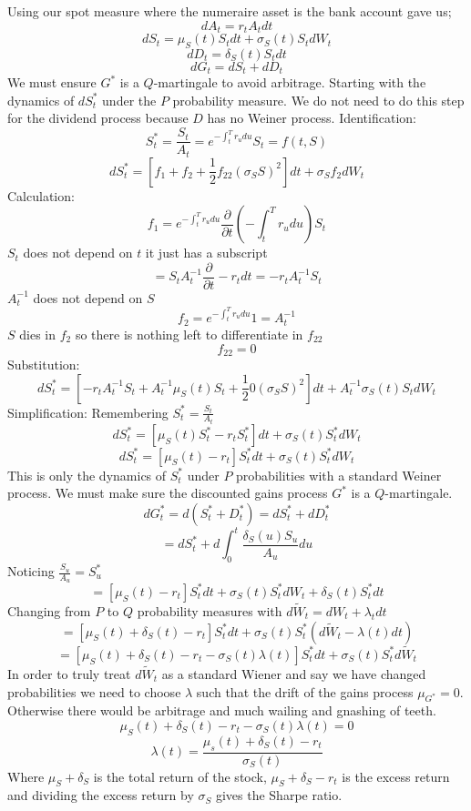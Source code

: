 \documentclass[12pt]{article}
\begin{document}
Using our spot measure where the numeraire asset is the bank account gave us;
$$dA_t=r_tA_tdt$$
$$dS_t=\mu_S(t)S_tdt+\sigma_S(t)S_tdW_t$$
$$dD_t=\delta_S(t)S_tdt$$
$$dG_t=dS_t+dD_t$$
We must ensure $G^*$ is a $Q$-martingale to avoid arbitrage. Starting with the
dynamics of $dS_t^*$ under the $P$ probability measure. We do not need to do
this step for the dividend process because $D$ has no Weiner process.
Identification:
$$S_t^*=\frac{S_t}{A_t}=e^{-\int_t^Tr_udu}S_t=f(t,S)$$
$$dS_t^*=\left[ f_1+f_2+\frac{1}{2}f_{22}(\sigma_SS)^2 \right] dt+
\sigma_Sf_2dW_t$$
Calculation:
$$f_1=e^{-\int_t^Tr_udu}\frac{\partial}{\partial t}
\left( -\int_t^Tr_udu\right) S_t$$
$S_t$ does not depend on $t$ it just has a subscript
$$=S_tA_t^{-1}\frac{\partial}{\partial t}-r_tdt=-r_tA_t^{-1}S_t$$
$A_t^{-1}$ does not depend on $S$
$$f_2=e^{-\int_t^Tr_udu}1=A_t^{-1}$$
$S$ dies in $f_2$ so there is nothing left to differentiate in $f_{22}$
$$f_{22}=0$$
Substitution:
$$dS_t^*=\left[ -r_tA_t^{-1}S_t+A_t^{-1}\mu_S(t)S_t+\frac{1}{2}0(\sigma_SS)^2
\right] dt+A_t^{-1}\sigma_S(t)S_tdW_t$$
Simplification: Remembering $S_t^*=\frac{S_t}{A_t}$
$$dS_t^*=\left[ \mu_S(t)S_t^*-r_tS_t^*\right] dt+\sigma_S(t)S_t^*dW_t$$
$$dS_t^*=\left[ \mu_S(t)-r_t\right] S_t^*dt+\sigma_S(t)S_t^*dW_t$$
This is only the dynamics of $S_t^*$ under $P$ probabilities with a standard
Weiner process.
We must make sure the discounted gains process $G^*$ is a $Q$-martingale.
$$dG_t^*=d(S_t^*+D_t^*)=dS_t^*+dD_t^*$$
$$=dS_t^*+d\int_0^t\frac{\delta_S(u)S_u}{A_u}du$$
Noticing $\frac{S_u}{A_u}=S_u^*$
$$=[\mu_S(t)-r_t]S_t^*dt+\sigma_S(t)S_t^*dW_t+\delta_S(t)S_t^*dt$$
Changing from $P$ to $Q$ probability measures with
$d\tilde{W}_t=dW_t+\lambda_tdt$
$$=[\mu_S(t)+\delta_S(t)-r_t]S_t^*dt+
\sigma_S(t)S_t^*(d\tilde{W}_t-\lambda(t)dt)$$
$$=[\mu_S(t)+\delta_S(t)-r_t-\sigma_S(t)\lambda(t)]S_t^*dt+
\sigma_S(t)S_t^*d\tilde{W}_t$$
In order to truly treat $d\tilde{W}_t$ as a standard Wiener and say we have
changed probabilities we need to choose $\lambda$ such that the drift of the
gains process $\mu_{G^*}=0$. Otherwise there would be arbitrage and much
wailing and gnashing of teeth.
$$\mu_S(t)+\delta_S(t)-r_t-\sigma_S(t)\lambda(t)=0$$
$$\lambda(t)=\frac{\mu_s(t)+\delta_S(t)-r_t}{\sigma_S(t)}$$
Where $\mu_S+\delta_S$ is the total return of the stock,
$\mu_S+\delta_S-r_t$ is the excess return and dividing the excess return by
$\sigma_S$ gives the Sharpe ratio.
\end{document}
